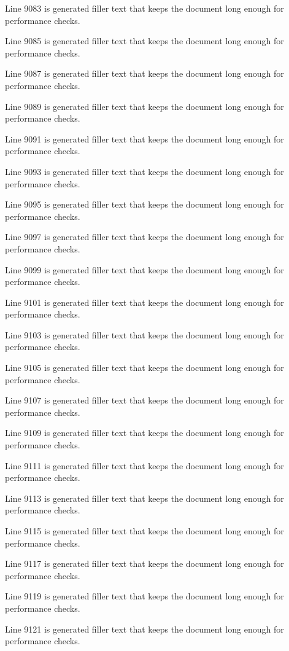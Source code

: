 Line 9083 is generated filler text that keeps the document long enough for performance checks.

Line 9085 is generated filler text that keeps the document long enough for performance checks.

Line 9087 is generated filler text that keeps the document long enough for performance checks.

Line 9089 is generated filler text that keeps the document long enough for performance checks.

Line 9091 is generated filler text that keeps the document long enough for performance checks.

Line 9093 is generated filler text that keeps the document long enough for performance checks.

Line 9095 is generated filler text that keeps the document long enough for performance checks.

Line 9097 is generated filler text that keeps the document long enough for performance checks.

Line 9099 is generated filler text that keeps the document long enough for performance checks.

Line 9101 is generated filler text that keeps the document long enough for performance checks.

Line 9103 is generated filler text that keeps the document long enough for performance checks.

Line 9105 is generated filler text that keeps the document long enough for performance checks.

Line 9107 is generated filler text that keeps the document long enough for performance checks.

Line 9109 is generated filler text that keeps the document long enough for performance checks.

Line 9111 is generated filler text that keeps the document long enough for performance checks.

Line 9113 is generated filler text that keeps the document long enough for performance checks.

Line 9115 is generated filler text that keeps the document long enough for performance checks.

Line 9117 is generated filler text that keeps the document long enough for performance checks.

Line 9119 is generated filler text that keeps the document long enough for performance checks.

Line 9121 is generated filler text that keeps the document long enough for performance checks.

